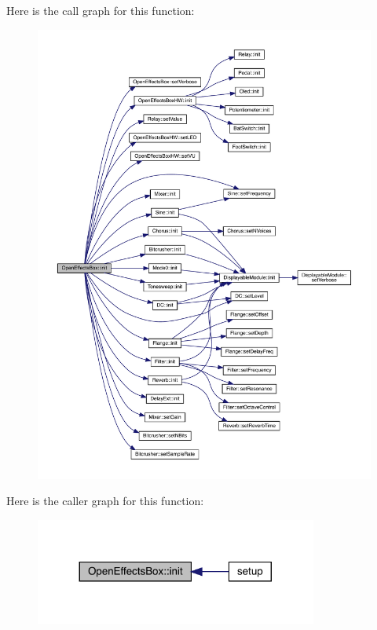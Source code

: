 Here is the call graph for this function\+:\nopagebreak
\begin{figure}[H]
\begin{center}
\leavevmode
\includegraphics[width=350pt]{class_open_effects_box_aea127362d5b00701ced70f20f728b60f_cgraph}
\end{center}
\end{figure}
Here is the caller graph for this function\+:\nopagebreak
\begin{figure}[H]
\begin{center}
\leavevmode
\includegraphics[width=263pt]{class_open_effects_box_aea127362d5b00701ced70f20f728b60f_icgraph}
\end{center}
\end{figure}
\mbox{\label{class_open_effects_box_a9e14e8a10c05e2aedacf1f8684e5abab}} 
